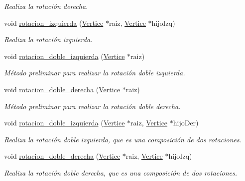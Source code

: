 \begin{DoxyCompactItemize}
\begin{DoxyCompactList}\small\item\em Realiza la rotación derecha. \end{DoxyCompactList}\item 
void \hyperlink{classArbolAVL_abfaf2247b607b040e328391ec8621546}{rotacion\+\_\+izquierda} (\hyperlink{classVertice}{Vertice} $\ast$raiz, \hyperlink{classVertice}{Vertice} $\ast$hijo\+Izq)
\begin{DoxyCompactList}\small\item\em Realiza la rotación izquierda. \end{DoxyCompactList}\item 
void \hyperlink{classArbolAVL_a0b4342509dd935785b6f54924e06afea}{rotacion\+\_\+doble\+\_\+izquierda} (\hyperlink{classVertice}{Vertice} $\ast$raiz)
\begin{DoxyCompactList}\small\item\em Método preliminar para realizar la rotación doble izquierda. \end{DoxyCompactList}\item 
void \hyperlink{classArbolAVL_af75605601cca6de40f6e6f5b11bfce8e}{rotacion\+\_\+doble\+\_\+derecha} (\hyperlink{classVertice}{Vertice} $\ast$raiz)
\begin{DoxyCompactList}\small\item\em Método preliminar para realizar la rotación doble derecha. \end{DoxyCompactList}\item 
void \hyperlink{classArbolAVL_a3115c59bd2be761c530eeeb11a169700}{rotacion\+\_\+doble\+\_\+izquierda} (\hyperlink{classVertice}{Vertice} $\ast$raiz, \hyperlink{classVertice}{Vertice} $\ast$hijo\+Der)
\begin{DoxyCompactList}\small\item\em Realiza la rotación doble izquierda, que es una composición de dos rotaciones. \end{DoxyCompactList}\item 
void \hyperlink{classArbolAVL_aa481f6a1014b68159b1fe753b96bde62}{rotacion\+\_\+doble\+\_\+derecha} (\hyperlink{classVertice}{Vertice} $\ast$raiz, \hyperlink{classVertice}{Vertice} $\ast$hijo\+Izq)
\begin{DoxyCompactList}\small\item\em Realiza la rotación doble derecha, que es una composición de dos rotaciones. \end{DoxyCompactList}\item 
\mbox{\label{classArbolAVL_ae47585dbdb912214f41eab88eb979e33}} 

\end{DoxyCompactItemize}
